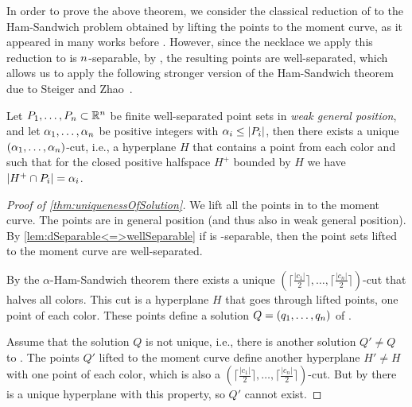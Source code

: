 \documentclass[a4paper,UKenglish,cleveref, thm-restate]{lipics-v2021}
\begin{document}
In order to prove the above theorem, we consider the classical reduction of \TwoThiefNecklaceSplitting to the Ham-Sandwich problem obtained by lifting the points to the moment curve, as it appeared in many works before \cite{momentCurve2,HamSandwichPPAComplete,matousek2002lectures,momentCurve1}. However, since the necklace we apply this reduction to is $\dimension$-separable, by , the resulting points are well-separated, which allows us to apply the following stronger version of the Ham-Sandwich theorem due to Steiger and Zhao~\cite{originalDiscreteAlphaHS}.

\begin{lemma}\label{lem:alphaHS}
Let $P_1, \dots, P_\dimension \subset \Reals^\dimension$ be finite well-separated point sets in \emph{weak general position}, and let $\alpha_1, \dots, \alpha_\dimension$ be positive integers with $\alpha_i \leq \lvert P_i \rvert$, then there exists a unique $(\alpha_1, \dots, \alpha_\dimension)$-cut, i.e., a hyperplane $H$ that contains a point from each color and such that for the closed positive halfspace $H^+$ bounded by $H$ we have $\lvert H^+ \cap P_i \rvert = \alpha_i$.
\end{lemma}

\begin{proof}[Proof of \cref{thm:uniquenessOfSolution}]
We lift all the points in \Colors to the moment curve.
The points are in general position \cite{matousek2002lectures} (and thus also in weak general position).
By \cref{lem:dSeparable<=>wellSeparable} if \Colors is \dimension-separable, then the point sets lifted to the moment curve are well-separated. 

By the $\alpha$-Ham-Sandwich theorem there exists a unique $(\lceil\frac{|c_1|}{2}\rceil,\ldots,\lceil\frac{|c_n|}{2}\rceil)$-cut that halves all colors.
This cut is a hyperplane $H$ that goes through \dimension lifted points, one point of each color.
These points define a solution $Q =(q_1, \dots, q_\dimension)$ of \TwoThiefNecklaceSplitting.

Assume that the solution $Q$ is not unique, i.e., there is another solution $Q'\neq Q$ to \Colors.
The points $Q'$ lifted to the moment curve define another hyperplane $H' \neq H$ with one point of each color, which is also a $(\lceil\frac{|c_1|}{2}\rceil,\ldots,\lceil\frac{|c_n|}{2}\rceil)$-cut.
But by  there is a unique hyperplane with this property, so $Q'$ cannot exist.
\end{proof}
\end{document}
